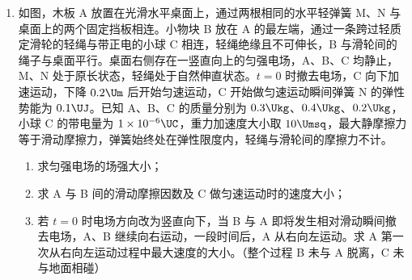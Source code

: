 \documentclass[\gkver]{gaokaozhenti}
\begin{document}
\begin{enumerate}
{解得 $B = \frac{1}{d} \sqrt{\frac{2mU}{q}}$
}

\item
如图，木板 A 放置在光滑水平桌面上，通过两根相同的水平轻弹簧 M、N 与桌面上的两个固定挡板相连。小物块 B 放在 A 的最左端，通过一条跨过轻质定滑轮的轻绳与带正电的小球 C 相连，轻绳绝缘且不可伸长，B 与滑轮间的绳子与桌面平行。桌面右侧存在一竖直向上的匀强电场，A、B、C 均静止，M、N 处于原长状态，轻绳处于自然伸直状态。$t = 0$ 时撤去电场，C 向下加速运动，下降 $0.2 \Um$ 后开始匀速运动，C 开始做匀速运动瞬间弹簧 N 的弹性势能为 $0.1 \UJ$。已知 A、B、C 的质量分别为 $0.3 \Ukg$、$0.4 \Ukg$、$0.2 \Ukg$，小球 C 的带电量为 $1\times10^{-6} \UC$，重力加速度大小取 $10 \Umsq$，最大静摩擦力等于滑动摩擦力，弹簧始终处在弹性限度内，轻绳与滑轮间的摩擦力不计。
\begin{enumerate}
	\item
	求匀强电场的场强大小；
	\item
	求 A 与 B 间的滑动摩擦因数及 C 做匀速运动时的速度大小；
	\item
	若 $t = 0$ 时电场方向改为竖直向下，当 B 与 A 即将发生相对滑动瞬间撤去电场，A、B 继续向右运动，一段时间后，A 从右向左运动。求 A 第一次从右向左运动过程中最大速度的大小。（整个过程 B 未与 A 脱离，C 未与地面相碰）
\end{enumerate}

\end{enumerate}
\end{document}
